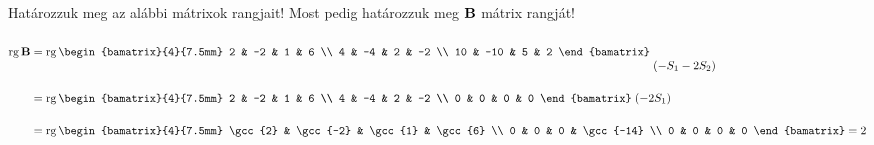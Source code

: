 \begin{exercise}{Határozzuk meg az alábbi mátrixok rangjait!}
{    Most pedig határozzuk meg $\mathbf{B}$ mátrix rangját!
    \begin{align*}
      \rg \rmat B
       & = \rg
      \begin{bamatrix}{4}{7.5mm}
        2  & -2  & 1 & 6  \\
        4  & -4  & 2 & -2 \\
        10 & -10 & 5 & 2
      \end{bamatrix}
      \;
      \begin{matrix}
        \\\\(-S_1 - 2S_2)
      \end{matrix}
      \\
       & = \rg
      \begin{bamatrix}{4}{7.5mm}
        2  & -2  & 1 & 6  \\
        4  & -4  & 2 & -2 \\
        0 & 0 & 0 & 0
      \end{bamatrix}
      \;
      \begin{matrix}
        \\(-2S_1)\\\,
      \end{matrix}
      \\
       & = \rg
      \begin{bamatrix}{4}{7.5mm}
        \gcc{2} & \gcc{-2} & \gcc{1} & \gcc{6}   \\
        0       & 0        & 0       & \gcc{-14} \\
        0       & 0        & 0       & 0
      \end{bamatrix}
      =2
    \end{align*}
  }
\end{exercise}
